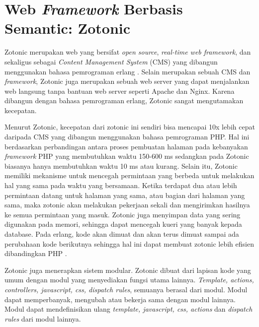 \section{Web \textit{Framework} Berbasis Semantic: Zotonic}

Zotonic merupakan web yang bersifat \textit{open source}, \textit{real-time web framework}, dan sekaligus sebagai \textit{Content Management System} (CMS) yang dibangun menggunakan bahasa pemrograman erlang \citep{zotonic.overview}. Selain merupakan sebuah CMS dan \textit{framework}, Zotonic juga merupakan sebuah web server yang dapat menjalankan web langsung tanpa bantuan web server seperti Apache dan Nginx. Karena dibangun dengan bahasa pemrograman erlang, Zotonic sangat mengutamakan kecepatan.

Menurut Zotonic, kecepatan dari zotonic ini sendiri bisa mencapai 10x lebih cepat daripada CMS yang dibangun menggunakan bahasa pemrograman PHP. Hal ini berdasarkan perbandingan antara proses pembuatan halaman pada kebanyakan \textit{framework} PHP yang membutuhkan waktu 150-600 ms sedangkan pada Zotonic biasanya hanya membutuhkan waktu 10 ms atau kurang. Selain itu, Zotonic memiliki mekanisme untuk mencegah permintaan yang berbeda untuk melakukan hal yang sama pada waktu yang bersamaan. Ketika terdapat dua atau lebih permintaan datang untuk halaman yang sama, atau bagian dari halaman yang sama, maka zotonic akan melakukan pekerjaan sekali dan mengirimkan hasilnya ke semua permintaan yang masuk. Zotonic juga menyimpan data yang sering digunakan pada memori, sehingga dapat mencegah kueri yang banyak kepada database. Pada erlang, kode akan dimuat dan akan terus dimuat sampai ada perubahaan kode berikutnya sehingga hal ini dapat membuat zotonic lebih efisien dibandingkan PHP \citep{zotonic.speed}.

Zotonic juga menerapkan sistem modular. Zotonic dibuat dari lapisan kode yang umum dengan modul yang menyediakan fungsi utama lainnya. \textit{Template, actions, controllers, javascript, css, dispatch rules}, semuanya berasal dari modul. Modul dapat memperbanyak, mengubah atau bekerja sama dengan modul lainnya. Modul dapat mendefinisikan ulang \textit{template, javascript, css, actions} dan \textit{dispatch rules} dari modul lainnya.

